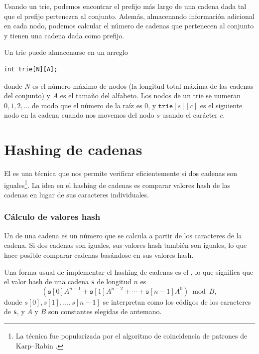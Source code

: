 Usando un trie, podemos encontrar
el prefijo más largo de una cadena dada
tal que el prefijo pertenezca al conjunto.
Además, almacenando información adicional
en cada nodo,
podemos calcular el número de
cadenas que pertenecen al conjunto y tienen una
cadena dada como prefijo.

Un trie puede almacenarse en un arreglo
\begin{lstlisting}
int trie[N][A];
\end{lstlisting}
donde $N$ es el número máximo de nodos
(la longitud total máxima de las cadenas del conjunto)
y $A$ es el tamaño del alfabeto.
Los nodos de un trie se numeran
$0,1,2,\ldots$ de modo que el número de la raíz es 0,
y $\texttt{trie}[s][c]$ es el siguiente nodo en la cadena
cuando nos movemos del nodo $s$ usando el carácter $c$.

\section{Hashing de cadenas}


El  es una técnica que
nos permite verificar eficientemente si dos
cadenas son iguales\footnote{La técnica
fue popularizada por el algoritmo de coincidencia de patrones
de Karp–Rabin \cite{kar87}.}.
La idea en el hashing de cadenas es comparar valores hash de
las cadenas en lugar de sus caracteres individuales.

\subsubsection*{Cálculo de valores hash}


Un  de una cadena es
un número que se calcula a partir de los caracteres
de la cadena.
Si dos cadenas son iguales,
sus valores hash también son iguales,
lo que hace posible comparar cadenas
basándose en sus valores hash.

Una forma usual de implementar el hashing de cadenas
es el , lo que significa
que el valor hash de una cadena \texttt{s}
de longitud $n$ es
\[(\texttt{s}[0] A^{n-1} + \texttt{s}[1] A^{n-2} + \cdots + \texttt{s}[n-1] A^0) \bmod B  ,\]
donde $s[0],s[1],\ldots,s[n-1]$
se interpretan como los códigos de los caracteres de \texttt{s},
y $A$ y $B$ son constantes elegidas de antemano.


